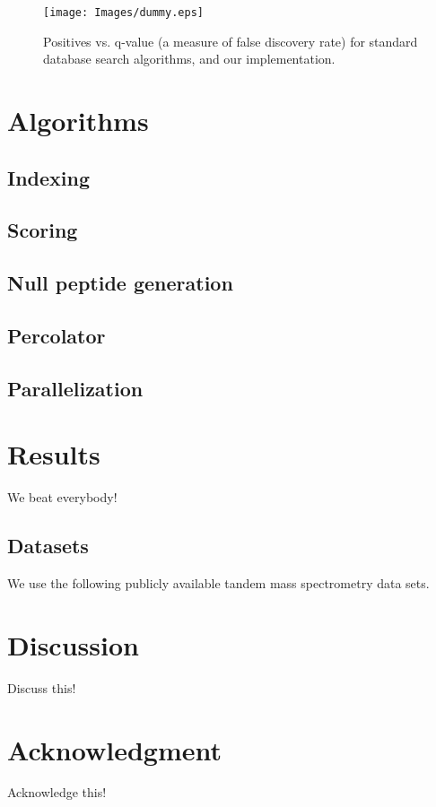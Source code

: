 \documentclass{bioinfo}
\begin{document}
\begin{figure}
  \centering
  \texttt{[image: Images/dummy.eps]}
  \caption{Positives vs. q-value (a measure of false discovery rate) for
  standard database search algorithms, and our implementation.}
  \label{figure:indexing}
\end{figure}



\section{Algorithms}

\subsection*{Indexing}
\subsection*{Scoring}
\subsection*{Null peptide generation}
\subsection*{Percolator}
\subsection*{Parallelization}

\section{Results}

We beat everybody!

\subsection*{Datasets}
We use the following publicly available tandem mass spectrometry data sets.

\section{Discussion}
Discuss this!

\section*{Acknowledgment}

Acknowledge this!





 
\end{document}

